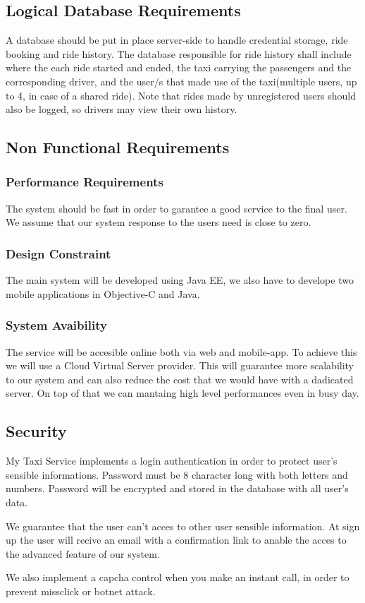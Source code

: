 \subsection{Logical Database Requirements}
	A database should be put in place server-side to handle credential storage, ride booking and ride history. The database responsible for ride history
	shall include where the each ride started and ended, the taxi carrying the passengers and the corresponding driver, and the user/s that made use of the
	taxi(multiple users, up to 4, in case of a shared ride). Note that rides made by unregistered users should also be logged, so drivers may view their own history.
\subsection {Non Functional Requirements}
 	\subsubsection{Performance Requirements}
 		The system should be fast in order to garantee a good service to the final user. We  assume that our system response to the users need is close to zero.
	\subsubsection {Design Constraint}
		The main system will be developed using Java EE, we also have to develope two mobile applications in
		Objective-C and Java.
	\subsubsection {System Avaibility}
		The service will be accesible online both via web and mobile-app. To achieve this we will use a Cloud Virtual Server provider. This will guarantee more scalability
		to our system and can also reduce the cost that we would have with a dadicated server. On top of that we can mantaing \askpippo high level performances even
		in busy day.
\subsection {Security}
	My Taxi Service implements a login authentication in order to protect user's sensible informations. Password must be 8 character long with both letters
	 and numbers\askpippo. Password will be encrypted and stored in the database with all user's data.

	We guarantee that the user can't acces to other user sensible information.
	At sign up the user will recive an email with a confirmation link to anable the acces to the advanced feature of our system.

	We also implement a capcha control when you make an instant call, in order to prevent missclick or botnet attack.
